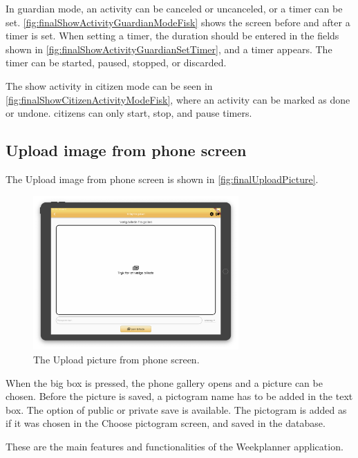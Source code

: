 In \gls{guardian} mode, an activity can be canceled or uncanceled, or a timer can be set. \autoref{fig:finalShowActivityGuardianModeFisk} shows the screen before and after a timer is set. When setting a timer, the duration should be entered in the fields shown in \autoref{fig:finalShowActivityGuardianSetTimer}, and a timer appears. The timer can be started, paused, stopped, or discarded.

The show activity in citizen mode can be seen in \autoref{fig:finalShowCitizenActivityModeFisk}, where an activity can be marked as done or undone. \Glspl{citizen} can only start, stop, and pause timers.

\subsection{Upload image from phone screen}

The Upload image from phone screen is shown in \autoref{fig:finalUploadPicture}.

\begin{figure}[H]
    \begin{center}
        \includegraphics[width=0.7\textwidth]{figures/FinalScreen/addPictogramFromGalleryScreen.png}
    \end{center}
    \caption{The Upload picture from phone screen.}
    \label{fig:finalUploadPicture}
\end{figure}

When the big box is pressed, the phone gallery opens and a picture can be chosen. Before the picture is saved, a pictogram name has to be added in the text box. The option of public or private save is available. The pictogram is added as if it was chosen in the Choose pictogram screen, and saved in the database.

These are the main features and functionalities of the Weekplanner application.